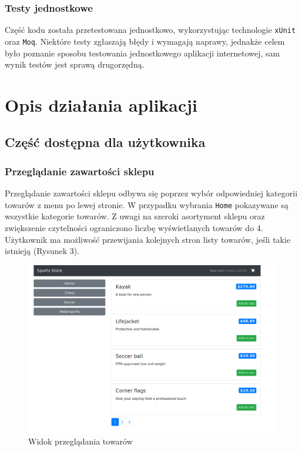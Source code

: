 \documentclass[a4paper,10pt]{article}
\begin{document}
\subsubsection{Testy jednostkowe}
Część kodu została przetestowana jednostkowo, wykorzystując technologie \texttt{xUnit} oraz \texttt{Moq}. Niektóre testy zgłaszają błędy i wymagają naprawy, jednakże celem było poznanie sposobu testowania jednostkowego aplikacji internetowej, sam wynik testów jest sprawą drugorzędną.

\section{Opis działania aplikacji}
\subsection{Część dostępna dla użytkownika}
\subsubsection{Przeglądanie zawartości sklepu}
Przeglądanie zawartości sklepu odbywa się poprzez wybór odpowiedniej kategorii towarów z menu po lewej stronie. W przypadku wybrania \texttt{Home} pokazywane są wszystkie kategorie towarów. Z uwagi na szeroki asortyment sklepu oraz zwiększenie czytelności ograniczono liczbę wyświetlanych towarów do 4. Użytkownik ma możliwość przewijania kolejnych stron listy towarów, jeśli takie istnieją (Rysunek 3).

\begin{figure}
 \centering
 \includegraphics[width=\linewidth]{Images/productsList.png}
 \caption{Widok przeglądania towarów}
 \label{rys:}
\end{figure}
\end{document}

